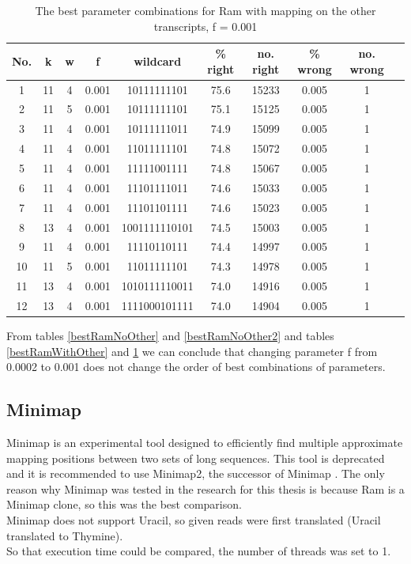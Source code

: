 \documentclass[times, utf8, zavrsni, numeric]{fer}
\begin{document}
\begin{longtable}{cccccccccc}
    \caption {The best parameter combinations for Ram with mapping on the other transcripts, f = 0.001}
    \label {bestRamWithOther2} \\
    \hline \multicolumn{1}{c}{\textbf{No.}} & \multicolumn{1}{c}{\textbf{k}} & \multicolumn{1}{c}{\textbf{w}}  
    & \multicolumn{1}{c}{\textbf{f}} & \multicolumn{1}{c}{\textbf{wildcard}} & \multicolumn{1}{c}{\textbf{\% right}}
    & \multicolumn{1}{c}{\textbf{no. right}}  & \multicolumn{1}{c}{\textbf{\% wrong}} & \multicolumn{1}{c}{\textbf{no. wrong}} \\ \hline
    \endfirsthead
    1 & 11 & 4 & 0.001 & 10111111101 & 75.6 & 15233 & 0.005 & 1 \\ \hline
    2 & 11 & 5 & 0.001 & 10111111101 & 75.1 & 15125 & 0.005 & 1 \\ \hline
    3 & 11 & 4 & 0.001 & 10111111011 & 74.9 & 15099 & 0.005 & 1 \\ \hline
    4 & 11 & 4 & 0.001 & 11011111101 & 74.8 & 15072 & 0.005 & 1 \\ \hline
    5 & 11 & 4 & 0.001 & 11111001111 & 74.8 & 15067 & 0.005 & 1 \\ \hline
    6 & 11 & 4 & 0.001 & 11101111011 & 74.6 & 15033 & 0.005 & 1 \\ \hline
    7 & 11 & 4 & 0.001 & 11101101111 & 74.6 & 15023 & 0.005 & 1 \\ \hline
    8 & 13 & 4 & 0.001 & 1001111110101 & 74.5 & 15003 & 0.005 & 1 \\ \hline
    9 & 11 & 4 & 0.001 & 11110110111 & 74.4 & 14997 & 0.005 & 1 \\ \hline
    10 & 11 & 5 & 0.001 & 11011111101 & 74.3 & 14978 & 0.005 & 1 \\ \hline
    11 & 13 & 4 & 0.001 & 1010111110011 & 74.0 & 14916 & 0.005 & 1 \\ \hline
    12 & 13 & 4 & 0.001 & 1111000101111 & 74.0 & 14904 & 0.005 & 1 \\ \hline
\end{longtable}

From tables \ref{bestRamNoOther} and \ref{bestRamNoOther2} and tables \ref{bestRamWithOther} and \ref{bestRamWithOther2} 
we can conclude that changing parameter f from 0.0002 to 0.001 does not change the order of best combinations
of parameters.

\subsection{Minimap}
Minimap is an experimental tool designed to efficiently find multiple approximate mapping positions between two sets of long sequences.
This tool is deprecated and it is recommended to use Minimap2, the successor of Minimap \cite{minimap}.
The only reason why Minimap was tested in the research for this thesis is because Ram is a Minimap clone, so this was the 
best comparison. \\
Minimap does not support Uracil, so given reads were first translated (Uracil translated to Thymine). \\
So that execution time could be compared, the number of threads was set to 1. 
\end{document}
